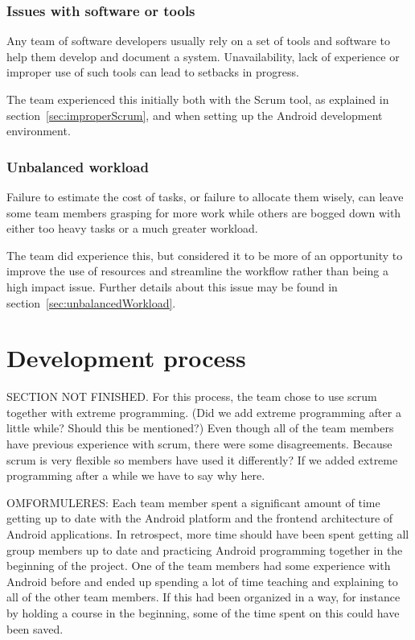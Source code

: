 \subsubsection{Issues with software or tools}
Any team of software developers usually rely on a set of tools and software to help them develop and document a system. Unavailability, lack of experience or improper use of such tools can lead to setbacks in progress.

The team experienced this initially both with the Scrum tool, as explained in section~\ref{sec:improperScrum}, and when setting up the Android development environment.

\subsubsection{Unbalanced workload}
Failure to estimate the cost of tasks, or failure to allocate them wisely, can leave some team members grasping for more work while others are bogged down with either too heavy tasks or a much greater workload.

The team did experience this, but considered it to be more of an opportunity to improve the use of resources and streamline the workflow rather than being a high impact issue. Further details about this issue may be found in section~\ref{sec:unbalancedWorkload}.


\section{Development process}
SECTION NOT FINISHED. For this process, the team chose to use scrum together with extreme programming. (Did we add extreme programming after a little while? Should this be mentioned?) Even though all of the team members have previous experience with scrum, there were some disagreements. Because scrum is very flexible so members have used it differently? If we added extreme programming after a while we have to say why here. 

OMFORMULERES: Each team member spent a significant amount of time getting up to date with the Android platform and the frontend architecture of Android applications. In retrospect, more time should have been spent getting all group members up to date and practicing Android programming together in the beginning of the project. One of the team members had some experience with Android before and ended up spending a lot of time teaching and explaining to all of the other team members. If this had been organized in a way, for instance by holding a course in the beginning, some of the time spent on this could have been saved. 

